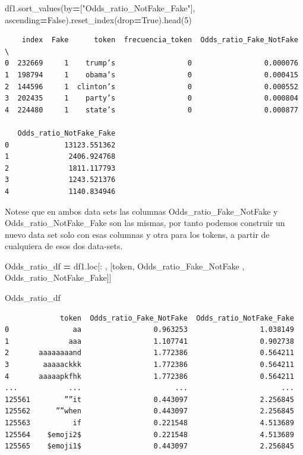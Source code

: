 \documentclass[
  11pt,
  a4paper,
]{article}
\newenvironment{Shaded}{\begin{snugshade}}{\end{snugshade}}
\newcommand{\DecValTok}[1]{\textcolor[rgb]{0.00,0.00,0.81}{#1}}
\newcommand{\NormalTok}[1]{#1}
\newcommand{\OperatorTok}[1]{\textcolor[rgb]{0.81,0.36,0.00}{\textbf{#1}}}
\newcommand{\StringTok}[1]{\textcolor[rgb]{0.31,0.60,0.02}{#1}}
\newcommand{\VariableTok}[1]{\textcolor[rgb]{0.00,0.00,0.00}{#1}}
\begin{document}
\begin{Shaded}
\begin{Highlighting}[]
\NormalTok{df1.sort\_values(by}\OperatorTok{=}\NormalTok{[}\StringTok{"Odds\_ratio\_NotFake\_Fake"}\NormalTok{], ascending}\OperatorTok{=}\VariableTok{False}\NormalTok{).reset\_index(drop}\OperatorTok{=}\VariableTok{True}\NormalTok{).head(}\DecValTok{5}\NormalTok{)}
\end{Highlighting}
\end{Shaded}

\begin{verbatim}
    index  Fake      token  frecuencia_token  Odds_ratio_Fake_NotFake  \
0  232669     1    trump’s                 0                 0.000076   
1  198794     1    obama’s                 0                 0.000415   
2  144596     1  clinton’s                 0                 0.000552   
3  202435     1    party’s                 0                 0.000804   
4  224480     1    state’s                 0                 0.000877   

   Odds_ratio_NotFake_Fake  
0             13123.551362  
1              2406.924768  
2              1811.117793  
3              1243.521376  
4              1140.834946 
\end{verbatim}

Notese que en ambos data sets las columnas Odds\_ratio\_Fake\_NotFake y
Odds\_ratio\_NotFake\_Fake son las mismas, por tanto podemos construir
un nuevo data set solo con esas columnas y otra para los tokens, a
partir de cualquiera de esos dos data-sets.

\begin{Shaded}
\begin{Highlighting}[]
\NormalTok{Odds\_ratio\_df }\OperatorTok{=}\NormalTok{ df1.loc[: , [}\StringTok{\textquotesingle{}token\textquotesingle{}}\NormalTok{, }\StringTok{\textquotesingle{}Odds\_ratio\_Fake\_NotFake\textquotesingle{}}\NormalTok{ , }\StringTok{\textquotesingle{}Odds\_ratio\_NotFake\_Fake\textquotesingle{}}\NormalTok{]]  }

\NormalTok{Odds\_ratio\_df}
\end{Highlighting}
\end{Shaded}

\begin{verbatim}
             token  Odds_ratio_Fake_NotFake  Odds_ratio_NotFake_Fake
0               aa                 0.963253                 1.038149
1              aaa                 1.107741                 0.902738
2       aaaaaaaand                 1.772386                 0.564211
3        aaaaackkk                 1.772386                 0.564211
4       aaaaapkfhk                 1.772386                 0.564211
...            ...                      ...                      ...
125561        ””it                 0.443097                 2.256845
125562      ””when                 0.443097                 2.256845
125563          if                 0.221548                 4.513689
125564    $emoji2$                 0.221548                 4.513689
125565    $emoji1$                 0.443097                 2.256845
\end{verbatim}
\end{document}
